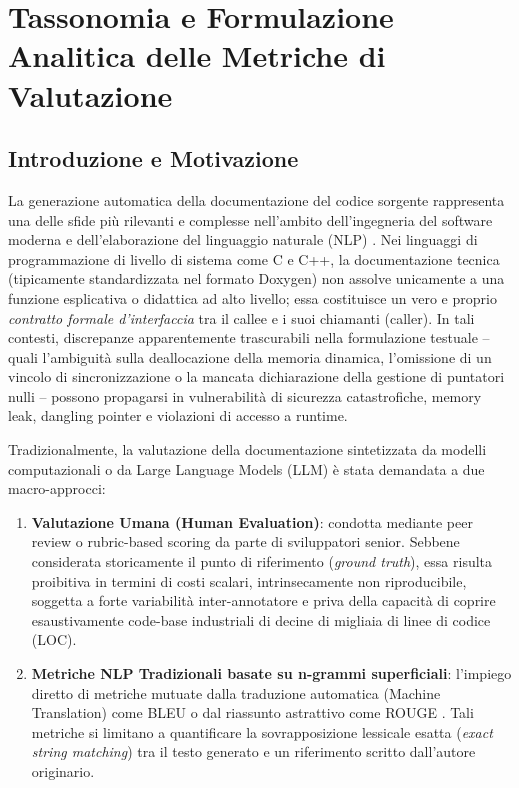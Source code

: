 \chapter{Tassonomia e Formulazione Analitica delle Metriche di Valutazione}
\label{chap:metriche}

\section{Introduzione e Motivazione}
\label{sec:intro_metriche}

La generazione automatica della documentazione del codice sorgente rappresenta una delle sfide più rilevanti e complesse nell'ambito dell'ingegneria del software moderna e dell'elaborazione del linguaggio naturale (NLP) \cite{zhang_survey_2022,rai_review_2022,zhu_automatic_2019}. Nei linguaggi di programmazione di livello di sistema come C e C++, la documentazione tecnica (tipicamente standardizzata nel formato Doxygen) non assolve unicamente a una funzione esplicativa o didattica ad alto livello; essa costituisce un vero e proprio \emph{contratto formale d'interfaccia} tra il callee e i suoi chiamanti (caller). In tali contesti, discrepanze apparentemente trascurabili nella formulazione testuale -- quali l'ambiguità sulla deallocazione della memoria dinamica, l'omissione di un vincolo di sincronizzazione o la mancata dichiarazione della gestione di puntatori nulli -- possono propagarsi in vulnerabilità di sicurezza catastrofiche, memory leak, dangling pointer e violazioni di accesso a runtime.

Tradizionalmente, la valutazione della documentazione sintetizzata da modelli computazionali o da Large Language Models (LLM) è stata demandata a due macro-approcci:
\begin{enumerate}
    \item \textbf{Valutazione Umana (Human Evaluation)}: condotta mediante peer review o rubric-based scoring da parte di sviluppatori senior. Sebbene considerata storicamente il punto di riferimento (\emph{ground truth}), essa risulta proibitiva in termini di costi scalari, intrinsecamente non riproducibile, soggetta a forte variabilità inter-annotatore e priva della capacità di coprire esaustivamente code-base industriali di decine di migliaia di linee di codice (LOC).
    \item \textbf{Metriche NLP Tradizionali basate su n-grammi superficiali}: l'impiego diretto di metriche mutuate dalla traduzione automatica (Machine Translation) come BLEU \cite{papineni_bleu_2002} o dal riassunto astrattivo come ROUGE \cite{lin_rouge_2004}. Tali metriche si limitano a quantificare la sovrapposizione lessicale esatta (\emph{exact string matching}) tra il testo generato e un riferimento scritto dall'autore originario.
\end{enumerate}

